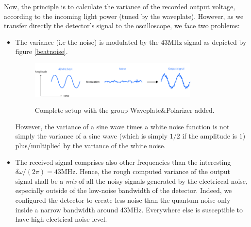 \documentclass[10pt]{report}
\begin{document}
Now, the principle is to calculate the variance of the recorded output voltage, according to the incoming light power (tuned by the waveplate). However, as we transfer directly the detector's signal to the oscilloscope, we face two problems:
\begin{itemize}
	\item The variance (i.e the noise) is modulated by the 43MHz signal as depicted by figure \ref{beatnoise}.
	
	\begin{figure}[h!]
	\caption{Complete setup with the group Waveplate\&Polarizer added.}
	\centering
	\includegraphics[width=0.8\textwidth]{beatnoise}
	\label{fig:beatnoise}
	\end{figure}
	
	However, the variance of a sine wave times a white noise function is not simply the variance of a sine wave (which is simply $1/2$ if the amplitude is $1$) plus/multiplied by the variance of the white noise.
	\item The received signal comprises also other frequencies than the interesting $\delta\omega/(2\pi) = 43$MHz. Hence, the rough computed variance of the output signal shall be a \textit{mix} of all the noisy signals generated by the electriccal noise, especially outside of the low-noise bandwidth of the detector. Indeed, we configured the detector to create less noise than the quantum noise only inside a narrow bandwidth around 43MHz. Everywhere else is susceptible to have high electrical noise level.
\end{itemize}
\end{document}
